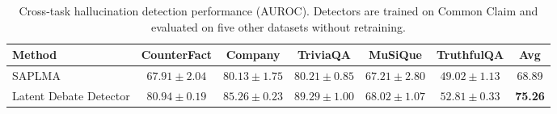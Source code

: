\begin{table}[t]
    \centering
    \tiny
    \setlength{\tabcolsep}{2.5mm}
    \begin{tabular}{lcccccc}
        \toprule
        \textbf{Method}
        & \textbf{CounterFact}
        & \textbf{Company}
        & \textbf{TriviaQA}
        & \textbf{MuSiQue}
        & \textbf{TruthfulQA}
        & \textbf{Avg} \\
        \midrule
        SAPLMA
        & $67.91 \pm 2.04$
        & $80.13 \pm 1.75$
        & $80.21 \pm 0.85$
        & $67.21 \pm 2.80$
        & $49.02 \pm 1.13$
        & 68.89 \\
        \rowcolor{gray!10}
        Latent Debate Detector
        & $\mathbf{80.94 \pm 0.19}$
        & $\mathbf{85.26 \pm 0.23}$
        & $\mathbf{89.29 \pm 1.00}$
        & $\mathbf{68.02 \pm 1.07}$
        & $\mathbf{52.81 \pm 0.33}$
        & \textbf{75.26} \\
        \bottomrule
    \end{tabular}
    \caption{Cross-task hallucination detection performance (AUROC). Detectors are trained on Common Claim and evaluated on five other datasets without retraining.}
    \label{tab:cross_task}
\end{table}
